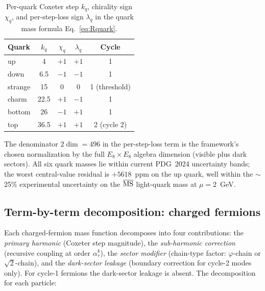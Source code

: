﻿\documentclass[reprint,amsmath,amssymb,aps,prd,longbibliography,floatfix]{revtex4-2}
\begin{document}
\begin{table}[h]
\centering
\caption{Per-quark Coxeter step $k_q$, chirality sign $\chi_q$, and
per-step-loss sign $\lambda_q$ in the quark mass formula
Eq.~\eqref{eq:Rquark}.}
\label{tab:quarksigns}
\begin{tabular}{lcccc}
\toprule
Quark & $k_q$ & $\chi_q$ & $\lambda_q$ & Cycle \\
\midrule
up      & 4    & $+1$ & $+1$ & 1 \\
down    & 6.5  & $-1$ & $-1$ & 1 \\
strange & 15   & $0$  & $0$  & 1 (threshold) \\
charm   & 22.5 & $+1$ & $-1$ & 1 \\
bottom  & 26   & $-1$ & $+1$ & 1 \\
top     & 36.5 & $+1$ & $+1$ & 2 (cycle 2) \\
\bottomrule
\end{tabular}
\end{table}

The denominator $2\dim = 496$ in the per-step-loss term is the
framework's chosen normalization by the full $E_8 \times E_8$ algebra
dimension (visible plus dark sectors). All six quark masses lie within current PDG~2024 uncertainty
bands; the worst central-value residual is $+5618$~ppm on the up quark,
well within the $\sim$25\% experimental uncertainty on the
$\overline{\rm MS}$ light-quark mass at $\mu = 2$~GeV.

\subsection{Term-by-term decomposition: charged fermions}
\label{sub:fermion-terms}

Each charged-fermion mass function decomposes into four contributions:
the \emph{primary harmonic} (Coxeter step magnitude), the
\emph{sub-harmonic correction} (recursive coupling at order
$\alpha_\tau^k$), the \emph{sector modifier} (chain-type factor:
$\varphi$-chain or $\sqrt{2}$-chain), and the \emph{dark-sector
leakage} (boundary correction for cycle-2 modes only). For
cycle-1 fermions the dark-sector leakage is absent. The
decomposition for each particle:
\end{document}

